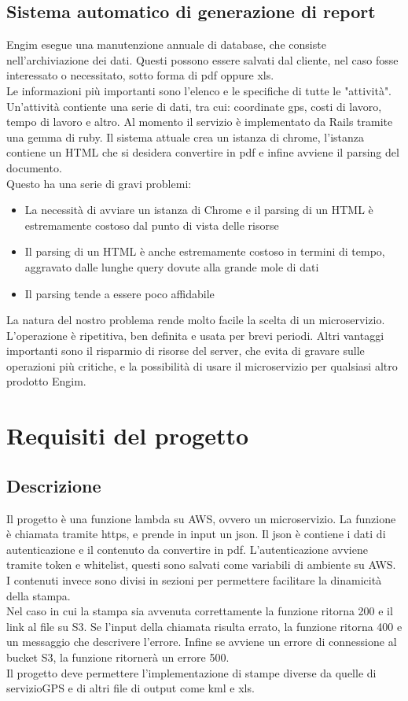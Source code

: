 \documentclass[12pt]{article}
\begin{document}
\subsection{Sistema automatico di generazione di report}
Engim esegue una manutenzione annuale di database, che consiste nell'archiviazione
dei dati. Questi possono essere salvati dal cliente, nel caso fosse interessato 
o necessitato, sotto forma di pdf oppure xls.
\\ 
Le informazioni più importanti sono l'elenco e le specifiche di tutte le "attività". 
Un'attività contiente una serie di dati, tra cui: coordinate
gps, costi di lavoro, tempo di lavoro e altro.  
Al momento il servizio è implementato da Rails tramite una gemma di ruby. 
Il sistema attuale crea un istanza di chrome, l'istanza contiene un HTML
che si desidera convertire in pdf e infine avviene il parsing del documento.
\\ Questo ha una serie di gravi problemi:
\begin{itemize}
  \item La necessità di avviare un istanza di Chrome e il parsing di un HTML è
  estremamente costoso dal punto di vista delle risorse
  \item Il parsing di un HTML è anche estremamente costoso in termini di tempo,
  aggravato dalle lunghe query dovute alla grande mole di dati 
  \item Il  parsing tende a essere poco affidabile
\end{itemize}
La natura del nostro problema rende molto facile la scelta di un microservizio.
L'operazione è ripetitiva, ben definita e usata per brevi periodi. Altri vantaggi 
importanti sono il risparmio di risorse del server, che evita di gravare sulle 
operazioni più critiche, e la possibilità di usare il microservizio per qualsiasi 
altro prodotto Engim.


\section{Requisiti del progetto}
\subsection{Descrizione}
Il progetto è una funzione lambda su AWS, ovvero un microservizio. La funzione 
è chiamata tramite https, e prende in input un json. Il json è contiene i dati 
di autenticazione e il contenuto da convertire in pdf. L'autenticazione avviene 
tramite token e whitelist, questi sono salvati come variabili di ambiente su AWS.
I contenuti invece sono divisi in sezioni per permettere facilitare la dinamicità 
della stampa.
\\ Nel caso in cui la stampa sia avvenuta correttamente la funzione ritorna 200 e 
il link al file su S3. Se l'input della chiamata risulta errato, la funzione ritorna 
400 e un messaggio che descrivere l'errore. Infine se avviene un errore di connessione 
al bucket S3, la funzione ritornerà un errore 500.    
\\ Il progetto deve permettere l'implementazione di stampe diverse da quelle di servizioGPS
e di altri file di output come kml e xls. 
\end{document}
